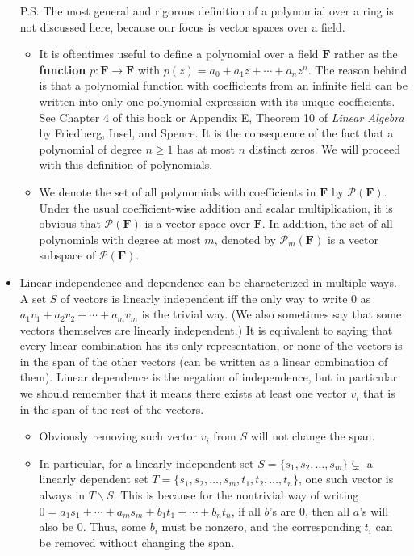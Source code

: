 \documentclass{article}
\newcommand{\F}{\mathbf{F}}
\begin{document}
\begin{itemize}
    P.S. The most general and rigorous definition of a polynomial over a ring is not discussed here, because our focus is vector spaces over a field.
    \begin{itemize}
        \item It is oftentimes useful to define a polynomial over a field $\F$ rather as the \textbf{function} $p: \F \rightarrow \F$ with $p(z) = a_0 + a_1 z + \cdots + a_n z^n$. The reason behind is that a polynomial function with coefficients from an infinite field can be written into only one polynomial expression with its unique coefficients. See Chapter 4 of this book or Appendix E, Theorem 10 of \textit{Linear Algebra} by Friedberg, Insel, and Spence. It is the consequence of the fact that a polynomial of degree $n \geq 1$ has at most $n$ distinct zeros. We will proceed with this definition of polynomials.
        \item We denote the set of all polynomials with coefficients in $\F$ by $\mathcal{P}(\F)$. Under the usual coefficient-wise addition and scalar multiplication, it is obvious that $\mathcal{P}(\F)$ is a vector space over $\F$. In addition, the set of all polynomials with degree at most $m$, denoted by $\mathcal{P}_m(\F)$ is a vector subspace of $\mathcal{P}(\F)$.
    \end{itemize}
    \item Linear independence and dependence can be characterized in multiple ways. A set $S$ of vectors is linearly independent iff the only way to write 0 as $a_1v_1 + a_2v_2 + \cdots +a_mv_m$ is the trivial way. (We also sometimes say that some vectors themselves are linearly independent.) It is equivalent to saying that every linear combination has its only representation, or none of the vectors is in the span of the other vectors (can be written as a linear combination of them). Linear dependence is the negation of independence, but in particular we should remember that it means there exists at least one vector $v_i$ that is in the span of the rest of the vectors.
    \begin{itemize}
        \item Obviously removing such vector $v_i$ from $S$ will not change the span.
        \item In particular, for a linearly independent set $S = \{s_1, s_2, \dots , s_m\} \subsetneq$ a linearly dependent set $T = \{s_1, s_2, \dots , s_m, t_1, t_2, \dots , t_n\}$, one such vector is always in $T \backslash S$. This is because for the nontrivial way of writing $0 = a_1s_1 + \cdots +a_ms_m + b_1 t_1 + \cdots + b_n t_n$, if all $b$'s are 0, then all $a$'s will also be 0. Thus, some $b_i$ must be nonzero, and the corresponding $t_i$ can be removed without changing the span.

\end{itemize}
\end{itemize}
\end{document}
